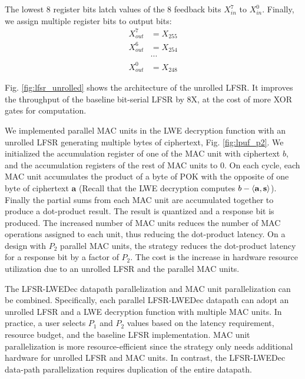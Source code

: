 The lowest 8 register bits latch values of the 8 feedback bits $X_{in} ^ 7$ to $X_{in} ^ 0$. Finally, we assign multiple register bits to output bits:
\begin{align*}
    X_{out} ^ 7 &=  X_{255} \\
    X_{out} ^ 6 &=  X_{254}  \\
    &\cdots \\
    X_{out} ^ 0 &= X_{248} 
\end{align*}

Fig. \ref{fig:lfsr_unrolled} shows the architecture of the unrolled LFSR. It improves the throughput of the baseline bit-serial LFSR by 8X, at the cost of more XOR gates for computation.

We implemented parallel MAC units in the LWE decryption function with an unrolled LFSR generating multiple bytes of ciphertext, Fig. \ref{fig:lpuf_p2}. We initialized the accumulation register of one of the MAC unit with ciphertext $b$, and the accumulation registers of the rest of MAC units to 0. On each cycle, each MAC unit accumulates the product of a byte of POK with the opposite of one byte of ciphertext $\mathbf{a}$ (Recall that the LWE decryption computes $b-\langle\mathbf{a},\mathbf{s}\rangle$). Finally the partial sums from each MAC unit are accumulated together to produce a dot-product result. The result is quantized and a response bit is produced. The increased number of MAC units reduces the number of MAC operations assigned to each unit, thus reducing the dot-product latency. On a design with $P_2$ parallel MAC units, the strategy reduces the dot-product latency for a response bit by a factor of $P_2$. The cost is the increase in hardware resource utilization due to an unrolled LFSR and the parallel MAC units.

The LFSR-LWEDec datapath parallelization and MAC unit parallelization can be combined. Specifically, each parallel LFSR-LWEDec datapath can adopt an unrolled LFSR and a LWE decryption function with multiple MAC units. In practice, a user selects $P_1$ and $P_2$ values based on the latency requirement, resource budget, and the baseline LFSR implementation. MAC unit parallelization is more resource-efficient since the strategy only needs additional hardware for unrolled LFSR and MAC units. In contrast, the LFSR-LWEDec data-path parallelization requires duplication of the entire datapath. 

